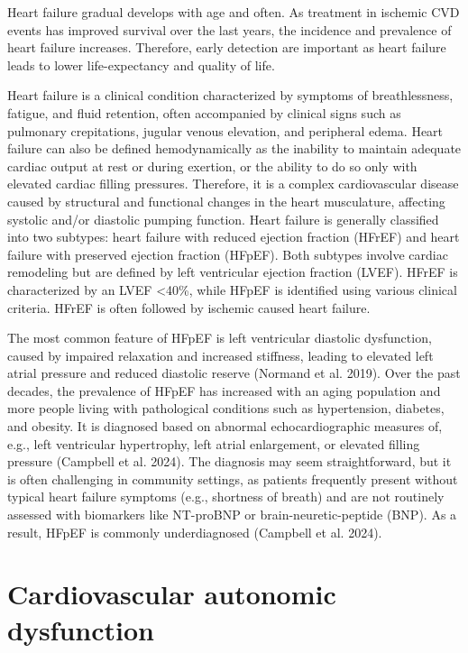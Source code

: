 \documentclass[
  a4paper,
  headsepline=true,
  open=any]{scrbook}
\begin{document}
Heart failure gradual develops with age and often. As treatment in
ischemic CVD events has improved survival over the last years, the
incidence and prevalence of heart failure increases. Therefore, early
detection are important as heart failure leads to lower life-expectancy
and quality of life.

Heart failure is a clinical condition characterized by symptoms of
breathlessness, fatigue, and fluid retention, often accompanied by
clinical signs such as pulmonary crepitations, jugular venous elevation,
and peripheral edema. Heart failure can also be defined hemodynamically
as the inability to maintain adequate cardiac output at rest or during
exertion, or the ability to do so only with elevated cardiac filling
pressures. Therefore, it is a complex cardiovascular disease caused by
structural and functional changes in the heart musculature, affecting
systolic and/or diastolic pumping function. Heart failure is generally
classified into two subtypes: heart failure with reduced ejection
fraction (HFrEF) and heart failure with preserved ejection fraction
(HFpEF). Both subtypes involve cardiac remodeling but are defined by
left ventricular ejection fraction (LVEF). HFrEF is characterized by an
LVEF \textless40\%, while HFpEF is identified using various clinical
criteria. HFrEF is often followed by ischemic caused heart failure.

The most common feature of HFpEF is left ventricular diastolic
dysfunction, caused by impaired relaxation and increased stiffness,
leading to elevated left atrial pressure and reduced diastolic reserve
(Normand et al. 2019). Over the past decades, the prevalence of HFpEF
has increased with an aging population and more people living with
pathological conditions such as hypertension, diabetes, and obesity. It
is diagnosed based on abnormal echocardiographic measures of, e.g., left
ventricular hypertrophy, left atrial enlargement, or elevated filling
pressure (Campbell et al. 2024). The diagnosis may seem straightforward,
but it is often challenging in community settings, as patients
frequently present without typical heart failure symptoms (e.g.,
shortness of breath) and are not routinely assessed with biomarkers like
NT-proBNP or brain-neuretic-peptide (BNP). As a result, HFpEF is
commonly underdiagnosed (Campbell et al. 2024).


\hypertarget{cardiovascular-autonomic-dysfunction}{%
\chapter{Cardiovascular autonomic
dysfunction}\label{cardiovascular-autonomic-dysfunction}}
\end{document}
